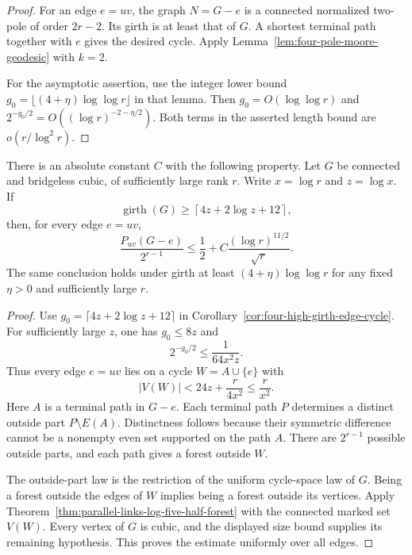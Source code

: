 \begin{proof}
For an edge $e=uv$, the graph $N=G-e$ is a connected normalized two-pole of order $2r-2$.
Its girth is at least that of $G$.
A shortest terminal path together with $e$ gives the desired cycle.
Apply Lemma~\ref{lem:four-pole-moore-geodesic} with $k=2$.

For the asymptotic assertion, use the integer lower bound $g_0=\lfloor(4+\eta)\log\log r\rfloor$ in that lemma.
Then $g_0=O(\log\log r)$ and $2^{-g_0/2}=O((\log r)^{-2-\eta/2})$.
Both terms in the asserted length bound are $o(r/\log^2r)$.
\end{proof}

\begin{corollary}
\label{cor:four-high-girth-deletion-excess}
There is an absolute constant $C$ with the following property.
Let $G$ be connected and bridgeless cubic, of sufficiently large rank $r$.
Write $x=\log r$ and $z=\log x$.
If
\[
 \operatorname{girth}(G)\ge
 \left\lceil4z+2\log z+12\right\rceil,
\]
then, for every edge $e=uv$,
\[
 \frac{P_{uv}(G-e)}{2^{r-1}}
 \le\frac12+C\frac{(\log r)^{11/2}}{\sqrt r}.
\]
The same conclusion holds under girth at least $(4+\eta)\log\log r$ for any fixed $\eta>0$ and sufficiently large $r$.
\end{corollary}

\begin{proof}
Use $g_0=\lceil4z+2\log z+12\rceil$ in Corollary~\ref{cor:four-high-girth-edge-cycle}.
For sufficiently large $z$, one has $g_0\le8z$ and
\[
 2^{-g_0/2}\le\frac{1}{64x^2z}.
\]
Thus every edge $e=uv$ lies on a cycle $W=A\cup\{e\}$ with
\[
 |V(W)|<24z+\frac{r}{4x^2}\le\frac{r}{x^2}.
\]
Here $A$ is a terminal path in $G-e$.
Each terminal path $P$ determines a distinct outside part $P\setminus E(A)$.
Distinctness follows because their symmetric difference cannot be a nonempty even set supported on the path $A$.
There are $2^{r-1}$ possible outside parts, and each path gives a forest outside $W$.

The outside-part law is the restriction of the uniform cycle-space law of $G$.
Being a forest outside the edges of $W$ implies being a forest outside its vertices.
Apply Theorem~\ref{thm:parallel-links-log-five-half-forest} with the connected marked set $V(W)$.
Every vertex of $G$ is cubic, and the displayed size bound supplies its remaining hypothesis.
This proves the estimate uniformly over all edges.
\end{proof}

